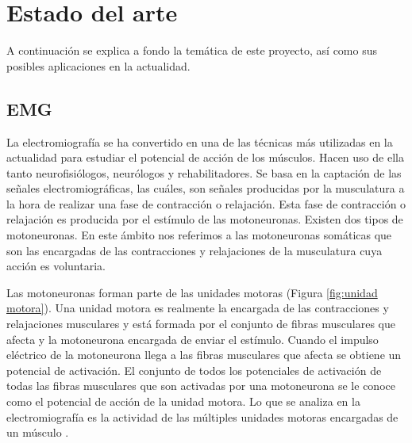 \chapter{Estado del arte}
A continuación se explica a fondo la temática de este proyecto, así como sus posibles aplicaciones en la actualidad. 

\section{EMG}
La electromiografía se ha convertido en una de las técnicas más utilizadas en la actualidad para estudiar el potencial de acción de los músculos. Hacen uso de ella tanto neurofisiólogos, neurólogos y rehabilitadores. Se basa en la captación de las señales electromiográficas, las cuáles, son señales producidas por la musculatura a la hora de realizar una fase de contracción o relajación. Esta fase de contracción o relajación es producida por el estímulo de las motoneuronas. Existen dos tipos de motoneuronas. En este ámbito nos referimos a las motoneuronas somáticas que son las encargadas de las contracciones y relajaciones de la musculatura cuya acción es voluntaria.

Las motoneuronas forman parte de las unidades motoras (Figura \ref{fig:unidad motora}). Una unidad motora es realmente la encargada de las contracciones y relajaciones musculares y está formada por el conjunto de fibras musculares que afecta y la motoneurona encargada de enviar el estímulo. Cuando el impulso eléctrico de la motoneurona llega a las fibras musculares que afecta se obtiene un potencial de activación. El conjunto de todos los potenciales de activación de todas las fibras musculares que son activadas por una motoneurona se le conoce como el potencial de acción de la unidad motora. Lo que se analiza en la electromiografía es la actividad de las múltiples unidades motoras encargadas de un músculo \cite{konrad2005abc,suarez2013bases}.

